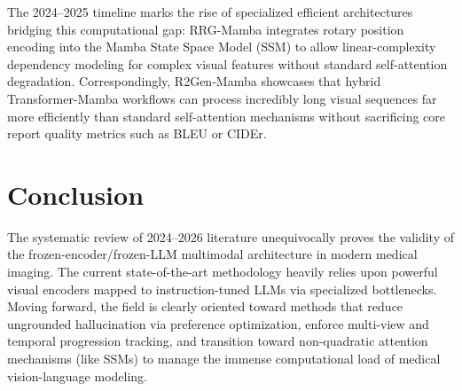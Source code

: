 \documentclass[11pt]{article}
\begin{document}
The 2024--2025 timeline marks the rise of specialized efficient architectures bridging this computational gap:
RRG-Mamba \cite{rrgmamba2025} integrates rotary position encoding into the Mamba State Space Model (SSM) to allow linear-complexity dependency modeling for complex visual features without standard self-attention degradation. Correspondingly, R2Gen-Mamba \cite{r2genmamba2025} showcases that hybrid Transformer-Mamba workflows can process incredibly long visual sequences far more efficiently than standard self-attention mechanisms without sacrificing core report quality metrics such as BLEU or CIDEr.

\section{Conclusion}

The systematic review of 2024--2026 literature unequivocally proves the validity of the frozen-encoder/frozen-LLM multimodal architecture in modern medical imaging. The current state-of-the-art methodology heavily relies upon powerful visual encoders mapped to instruction-tuned LLMs via specialized bottlenecks. Moving forward, the field is clearly oriented toward methods that reduce ungrounded hallucination via preference optimization, enforce multi-view and temporal progression tracking, and transition toward non-quadratic attention mechanisms (like SSMs) to manage the immense computational load of medical vision-language modeling.



\end{document}
